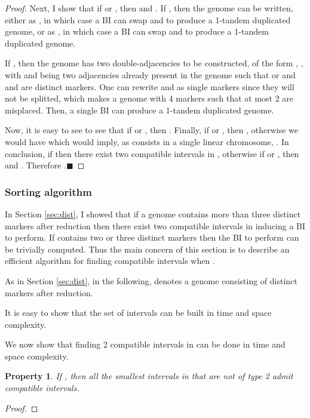 \documentclass[11pt,final,twoside,nofrench]{thlifl}
\newcommand{\qed}{\ensuremath{\blacksquare}}
\newtheorem{property}{Property}
\newtheorem{proof}{Proof}
\begin{document}
{\begin{proof}
Next, I show that if  or , then  and .
 If , then the genome can be written, either as
, in which case a BI
can swap  and  to produce a 1-tandem duplicated
genome, or as , in
which case a BI can swap  and  to produce a
1-tandem duplicated genome.

If , then the genome has two double-adjacencies to be
constructed, of the form , , with 
and  being two adjacencies already present in the genome
such that  or  and  and 
are distinct markers. One can rewrite  and  as
single markers since they will not be splitted, which makes a genome
with 4 markers such that at most 2 are misplaced. Then, a single BI
can produce a 1-tandem duplicated genome.

Now, it is easy to see to see that if   or , then . Finally, if   or , then , otherwise we would have   which would imply, as  consists in a single linear chromosome, .
In conclusion, if  then there exist two compatible intervals in  , otherwise if   or , then  and  . Therefore .\qed
\end{proof}

\subsubsection{Sorting algorithm}
\label{sec:scenario}

\noindent
In Section \ref{sec:dist}, I showed that if a genome  contains more than 
three distinct markers after reduction then there exist two compatible 
intervals in  inducing a BI to perform.
If  contains two or three distinct markers then the BI to perform can be 
trivially computed.
Thus the main concern of this section is to describe an efficient algorithm 
for finding compatible intervals when .

As in Section \ref{sec:dist}, in the following,  denotes a genome consisting 
of  distinct markers after reduction. 

It is easy to show that the set of intervals 
 can be built in  time and space complexity.

We now show that finding 2 compatible intervals in   can be done in  time and space complexity.

\begin{property}

If  , then all the smallest intervals in  that are not of type 2 admit compatible intervals.
\label{smallestOK}
\end{property}

\begin{proof}


\end{proof}}
\end{document}
